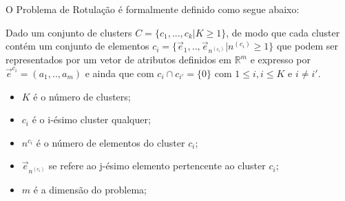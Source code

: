 O Problema de Rotulação é formalmente definido como segue abaixo:
    \begin{teorema}
    Dado um conjunto de clusters ${C=\{c_1,...,c_k | K \geqslant 1\} }$, de modo que cada cluster contém um conjunto de elementos ${c_i=\{\vec{e}_1,..,\vec{e}_{n^{(c_i)}}|n^{(c_i)} \geqslant 1 \}}$ que podem ser representados por um vetor de atributos definidos em ${\mathbb{R}^m }$ e expresso por ${ \vec{e}^{c_i}=(a_1,..,a_m)  }$ e ainda que  com ${ c_i \cap c_{i'}=\{0\} }$ com ${ 1 \leqslant i, i \leqslant K  }$ e ${ i \neq i' }$.
        \footnotemark 
        \begin{itemize}[noitemsep]
            \item ${K}$ é o número de clusters;
            \item ${c_i}$ é o i-ésimo cluster qualquer;
            \item ${n^{c_i}}$ é o número de elementos do cluster ${c_i}$;
            \item ${\vec{e}_{n^{(c_i)}}}$ se refere ao j-ésimo elemento pertencente ao cluster ${c_i}$;
            \item ${m}$ é a dimensão do problema;
        \end{itemize}
    \label{teo:problema}
    \end{teorema}




